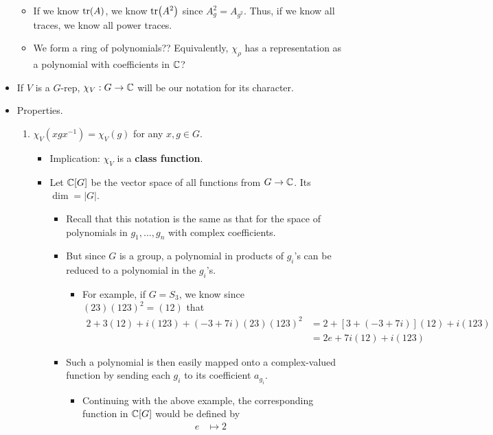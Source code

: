 \documentclass[../notes.tex]{subfiles}
\begin{document}
\begin{itemize}
\begin{itemize}
        \item If we know $\tr(A)$, we know $\tr(A^2)$ since $A_g^2=A_{g^2}$. Thus, if we know all traces, we know all power traces.
        \item We form a ring of polynomials?? Equivalently, $\chi_\rho$ has a representation as a polynomial with coefficients in $\mathbb{C}$?
    \end{itemize}
    \item If $V$ is a $G$-rep, $\chi_V:G\to\mathbb{C}$ will be our notation for its character.
    \item Properties.
    \begin{enumerate}
        \item $\chi_V(xgx^{-1})=\chi_V(g)$ for any $x,g\in G$.
        \begin{itemize}
            \item Implication: $\chi_V$ is a \textbf{class function}.
            \item Let $\mathbb{C}[G]$ be the vector space of all functions from $G\to\mathbb{C}$. Its $\dim=|G|$.
            \begin{itemize}
                \item Recall that this notation is the same as that for the space of polynomials in $g_1,\dots,g_n$ with complex coefficients.
                \item But since $G$ is a group, a polynomial in products of $g_i$'s can be reduced to a polynomial in the $g_i$'s.
                \begin{itemize}
                    \item For example, if $G=S_3$, we know since $(23)(123)^2=(12)$ that
                    \begin{align*}
                        2+3(12)+i(123)+(-3+7i)(23)(123)^2 &= 2+[3+(-3+7i)](12)+i(123)\\
                        &= 2e+7i(12)+i(123)
                    \end{align*}
                \end{itemize}
                \item Such a polynomial is then easily mapped onto a complex-valued function by sending each $g_i$ to its coefficient $a_{g_i}$.
                \begin{itemize}
                    \item Continuing with the above example, the corresponding function in $\mathbb{C}[G]$ would be defined by
                    \begin{align*}
                        e &\mapsto 2&

\end{align*}
\end{itemize}
\end{itemize}
\end{itemize}
\end{enumerate}
\end{itemize}
\end{document}
